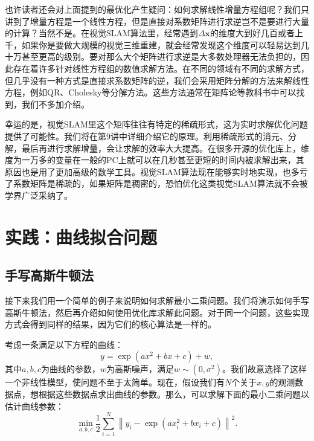也许读者还会对上面提到的最优化产生疑问：如何求解线性增量方程组呢？我们只讲到了增量方程是一个线性方程，但是直接对系数矩阵进行求逆岂不是要进行大量的计算？当然不是。在视觉SLAM算法里，经常遇到$\Delta \bm{x}$的维度大到好几百或者上千，如果你是要做大规模的视觉三维重建，就会经常发现这个维度可以轻易达到几十万甚至更高的级别。要对那么大个矩阵进行求逆是大多数处理器无法负担的，因此存在着许多针对线性方程组的数值求解方法。在不同的领域有不同的求解方式，但几乎没有一种方式是直接求系数矩阵的逆，我们会采用矩阵分解的方法来解线性方程，例如QR、Cholesky等分解方法。这些方法通常在矩阵论等教科书中可以找到，我们不多加介绍。

幸运的是，视觉SLAM里这个矩阵往往有特定的稀疏形式，这为实时求解优化问题提供了可能性。我们将在第9讲中详细介绍它的原理。利用稀疏形式的消元、分解，最后再进行求解增量，会让求解的效率大大提高。在很多开源的优化库上，维度为一万多的变量在一般的PC上就可以在几秒甚至更短的时间内被求解出来，其原因也是用了更加高级的数学工具。视觉SLAM算法现在能够实时地实现，也多亏了系数矩阵是稀疏的，如果矩阵是稠密的，恐怕优化这类视觉SLAM算法就不会被学界广泛采纳了\textsuperscript{\cite{Lourakis2009, Sibley2009a, Triggs2000}}。

\section{实践：曲线拟合问题}
\subsection{手写高斯牛顿法}
接下来我们用一个简单的例子来说明如何求解最小二乘问题。我们将演示如何手写高斯牛顿法，然后再介绍如何使用优化库求解此问题。对于同一个问题，这些实现方式会得到同样的结果，因为它们的核心算法是一样的。

考虑一条满足以下方程的曲线：
\[
y = \exp( ax^2 + bx + c ) + w,
\]
其中$a,b,c$为曲线的参数，$w$为高斯噪声，满足$w \sim (0, \sigma^2)$。我们故意选择了这样一个非线性模型，使问题不至于太简单。现在，假设我们有$N$个关于$x,y$的观测数据点，想根据这些数据点求出曲线的参数。那么，可以求解下面的最小二乘问题以估计曲线参数：
\begin{equation}
\min \limits_{a,b,c} \frac{1}{2}\sum\limits_{i = 1}^N {{{\left\| {{y_i} - \exp \left( {ax_i^2 + bx_i + c} \right)} \right\|}^2}} .
\end{equation}

